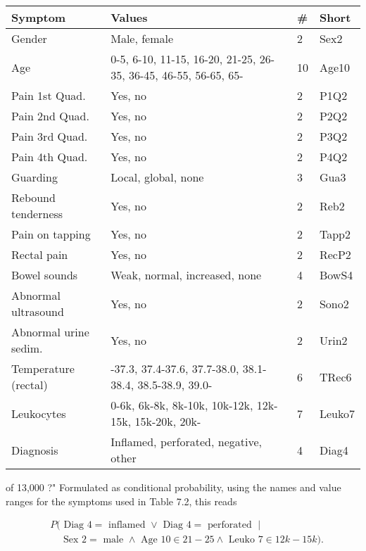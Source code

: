 \documentclass[10pt]{article}
\begin{document}
\begin{center}
\begin{tabular}{|l|l|l|l|}
\hline
Symptom & Values & \# & Short \\
\hline
Gender & Male, female & 2 & Sex2 \\
\hline
Age & 0-5, 6-10, 11-15, 16-20, 21-25, 26-35, 36-45, 46-55, 56-65, 65- & 10 & Age10 \\
\hline
Pain 1st Quad. & Yes, no & 2 & P1Q2 \\
\hline
Pain 2nd Quad. & Yes, no & 2 & P2Q2 \\
\hline
Pain 3rd Quad. & Yes, no & 2 & P3Q2 \\
\hline
Pain 4th Quad. & Yes, no & 2 & P4Q2 \\
\hline
Guarding & Local, global, none & 3 & Gua3 \\
\hline
Rebound tenderness & Yes, no & 2 & Reb2 \\
\hline
Pain on tapping & Yes, no & 2 & Tapp2 \\
\hline
Rectal pain & Yes, no & 2 & RecP2 \\
\hline
Bowel sounds & Weak, normal, increased, none & 4 & BowS4 \\
\hline
Abnormal ultrasound & Yes, no & 2 & Sono2 \\
\hline
Abnormal urine sedim. & Yes, no & 2 & Urin2 \\
\hline
Temperature (rectal) & -37.3, 37.4-37.6, 37.7-38.0, 38.1-38.4, 38.5-38.9, 39.0- & 6 & TRec6 \\
\hline
Leukocytes & 0-6k, 6k-8k, 8k-10k, 10k-12k, 12k-15k, 15k-20k, 20k- & 7 & Leuko7 \\
\hline
Diagnosis & Inflamed, perforated, negative, other & 4 & Diag4 \\
\hline
\end{tabular}
\end{center}

of 13,000 ?" Formulated as conditional probability, using the names and value ranges for the symptoms used in Table 7.2, this reads

$$
\begin{aligned}
& P(\text { Diag } 4=\text { inflamed } \vee \text { Diag } 4=\text { perforated } \mid \\
& \quad \text { Sex } 2=\text { male } \wedge \text { Age } 10 \in 21-25 \wedge \text { Leuko } 7 \in 12 k-15 k) .
\end{aligned}
$$
\end{document}
